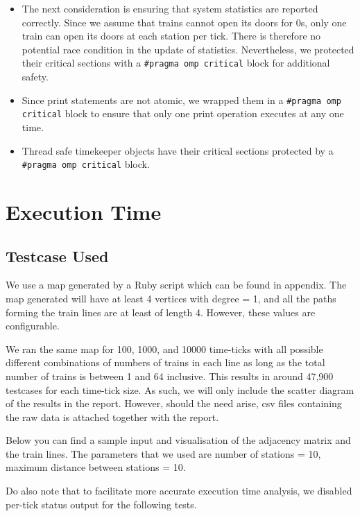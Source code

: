 \documentclass[a4paper,12pt]{article}
\begin{document}
\begin{itemize}
\begin{enumerate}
	      \end{enumerate}
	\item The next consideration is ensuring that system statistics are reported correctly. Since we assume that trains cannot open its doors for 0s, only one train can open its doors at each station per tick. There is therefore no potential race condition in the update of statistics. Nevertheless, we protected their critical sections with a \texttt{#pragma omp critical} block for additional safety.
	\item Since print statements are not atomic, we wrapped them in a \texttt{#pragma omp critical} block to ensure that only one print operation executes at any one time.
	\item Thread safe timekeeper objects have their critical sections protected by a \texttt{#pragma omp critical} block.
\end{itemize}

\section{Execution Time}

\subsection{Testcase Used}
We use a map generated by a Ruby script which can be found in appendix. The map generated will have at least 4 vertices with degree = 1, and all the paths forming the train lines are at least of length 4. However, these values are configurable.

We ran the same map for 100, 1000, and 10000 time-ticks with all possible different combinations of numbers of trains in each line as long as the total number of trains is between 1 and 64 inclusive. This results in around 47,900 testcases for each time-tick size. As such, we will only include the scatter diagram of the results in the report. However, should the need arise, csv files containing the raw data is attached together with the report.

Below you can find a sample input and visualisation of the adjacency matrix and the train lines. The parameters that we used are number of stations = 10, maximum distance between stations = 10.

Do also note that to facilitate more accurate execution time analysis, we disabled per-tick status output for the following tests.
\end{document}
